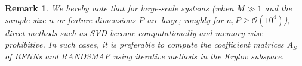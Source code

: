 \documentclass{article}
\newtheorem{remark}{Remark}
\begin{document}
\begin{remark}
We hereby note that for large-scale systems (when $M\gg 1$ and the sample size $n$ or feature dimensions $P$ are large; roughly for $n,P\ge\mathcal{O}(10^4)$), direct methods such as SVD become computationally and memory-wise prohibitive. In such cases, it is preferable to compute the coefficient matrices $A_S$ of RFNNs and RANDSMAP using iterative methods in the Krylov subspace. 



\end{remark}
\end{document}
